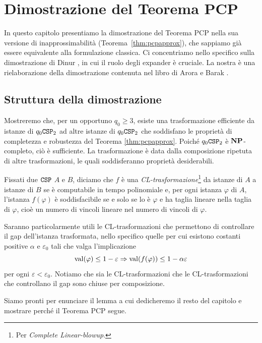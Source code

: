\chapter{Dimostrazione del Teorema PCP} \label{chap:pcpproof}

In questo capitolo presentiamo la dimostrazione del Teorema PCP nella sua
versione di inapprossimabilità (Teorema~\ref{thm:pcpapprox}), che sappiamo
già essere equivalente alla formulazione classica.
Ci concentriamo nello specifico sulla dimostrazione di Dinur \cite{Din06}, in
cui il ruolo degli expander è cruciale. La nostra è una rielaborazione della
dimostrazione contenuta nel libro di Arora e Barak \cite{ABbook}.

\section{Struttura della dimostrazione}

Mostreremo che, per un opportuno $q_0 \ge 3$, esiste una trasformazione
efficiente da istanze di $q_0\mathtt{CSP}_2$ ad altre istanze di $q_0\mathtt{CSP}_2$ che
soddisfano le proprietà di completezza e robustezza del Teorema
\ref{thm:pcpapprox}. Poiché $q_0\mathtt{CSP}_2$ è $\mathbf{NP}$-completo, ciò è sufficiente.
La trasformazione è data dalla composizione ripetuta di altre trasformazioni,
le quali soddisferanno proprietà desiderabili.

\begin{definition}
	Fissati due $\mathtt{CSP}$ $A$ e $B$, diciamo che $f$ è una
	\emph{CL-trasformazione}\footnote{Per \emph{Complete Linear-blowup}.} da
	istanze di $A$ a istanze di $B$ se è computabile in tempo polinomiale e,
	per ogni istanza $\varphi$ di $A$, l'istanza $f(\varphi)$ è soddisfacibile
	se e solo se lo è $\varphi$ e ha taglia lineare nella taglia di $\varphi$,
	cioè un numero di vincoli lineare nel numero di vincoli di $\varphi$.
\end{definition}

Saranno particolarmente utili le CL-trasformazioni che permettono di
controllare il gap dell'istanza trasformata, nello specifico quelle per cui
esistono costanti positive $\alpha$ e $\varepsilon_0$ tali che valga
l'implicazione
\[
	\operatorname{val}(\varphi) \le 1 - \varepsilon \Rightarrow
	\operatorname{val}(f(\varphi)) \le 1 - \alpha \varepsilon
\]
per ogni $\varepsilon < \varepsilon_0$. Notiamo che sia le CL-trasformazioni
che le CL-trasformazioni che controllano il gap sono chiuse per composizione.

Siamo pronti per enunciare il lemma a cui dedicheremo il resto del capitolo e
mostrare perché il Teorema PCP segue.

